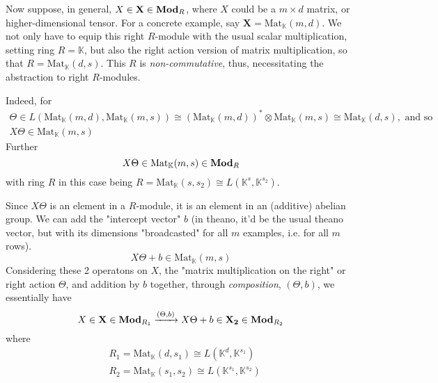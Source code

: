 \documentclass[10pt]{amsart}
\begin{document}
\begin{multicols*}{2}
Now suppose, in general, $X \in \textbf{X} \in \text{\textbf{Mod}}_R$, where $X$ could be a $m\times d$ matrix, or higher-dimensional tensor.  For a concrete example, say $\textbf{X} = \text{Mat}_{\mathbb{K}}(m,d)$.  We not only have to equip this right $R$-module with the usual scalar multiplication, setting ring $R=\mathbb{K}$, but also the right action version of matrix multiplication, so that $R = \text{Mat}_{\mathbb{K}}(d,s)$.  This $R$ is \emph{non-commutative}, thus, necessitating the abstraction to right $R$-modules.  

Indeed, for
\[
\begin{gathered}
	\Theta \in L( \text{Mat}_{\mathbb{K}}(m,d), \text{Mat}_{\mathbb{K}}(m,s) ) \cong    (\text{Mat}_{\mathbb{K}}(m,d))^* \otimes \text{Mat}_{\mathbb{K}}(m,s) \cong \text{Mat}_{\mathbb{K}}(d,s), \text{ and so } \\
X\Theta \in \text{Mat}_{\mathbb{K}}(m,s)
\end{gathered}
\]
Further
\[
X\Theta \in \text{Mat}_{\mathbb{K}}(m,s) \in \text{\textbf{Mod}}_R
\]
with ring $R$ in this case being $R=\text{Mat}_{\mathbb{K}}(s,s_2) \cong L(\mathbb{K}^s, \mathbb{K}^{s_2})$.  

Since $X\Theta$ is an element in a $R$-module, it is an element in an (additive) abelian group.  We can add the "intercept vector" $b$ (in theano, it'd be the usual theano vector, but with its dimensions "broadcasted" for all $m$ examples, i.e. for all $m$ rows).  
\[
X\Theta + b \in \text{Mat}_{\mathbb{K}}(m,s)
\]
Considering these 2 operatons on $X$, the "matrix multiplication on the right" or right action $\Theta$, and addition by $b$ together, through \emph{composition}, $(\Theta,b)$, we essentially have
\begin{equation}
X\in \mathbf{X} \in \text{\textbf{Mod}}_{R_1} \xrightarrow{ (\Theta,b) } X\Theta + b \in \mathbf{X_2} \in \text{\textbf{Mod}}_{R_2} 
\end{equation}
where
\[
\begin{aligned}
& R_1 = \text{Mat}_{\mathbb{K}}(d,s_1) \cong L(\mathbb{K}^d, \mathbb{K}^{s_1} ) \\ 
& R_2 = \text{Mat}_{\mathbb{K}}(s_1,s_2) \cong L(\mathbb{K}^{s_1}, \mathbb{K}^{s_2})
\end{aligned}
\]


\end{multicols*}
\end{document}
